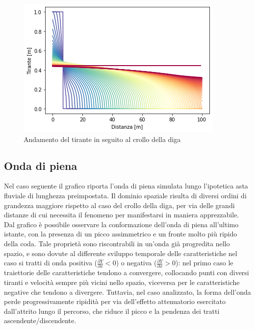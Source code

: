 \documentclass[12pt]{article} %
\begin{document}
\begin{figure} [H]
    \centering
    \includegraphics[scale=0.95]{Diga.png}
    \caption{Andamento del tirante in seguito al crollo della diga}
    \label{fig:diga}
\end{figure}

\subsection{Onda di piena}

\noindent Nel caso seguente il grafico riporta l'onda di piena simulata lungo l'ipotetica asta fluviale di lunghezza preimpostata. Il dominio spaziale risulta di diversi ordini di grandezza maggiore rispetto al caso del crollo della diga, per via delle grandi distanze di cui necessita il fenomeno per manifestarsi in maniera apprezzabile.\\
Dal grafico è possibile osservare la conformazione dell'onda di piena all'ultimo istante, con la presenza di un picco assimmetrico e un fronte molto più ripido della coda. Tale proprietà sono riscontrabili in un'onda già progredita nello spazio, e sono dovute al differente sviluppo temporale delle caratteristiche nel caso si tratti di onda positiva ($\frac{\partial Y}{\partial x}<0$) o negativa ($\frac{\partial Y}{\partial x}>0$): nel primo caso le traiettorie delle caratteristiche tendono a convergere, collocando punti con diversi tiranti e velocità sempre più vicini nello spazio, viceversa per le caratteristiche negative che tendono a divergere. Tuttavia, nel caso analizzato, la forma dell'onda perde progressivamente ripidità per via dell'effetto attenuatorio esercitato dall'attrito lungo il percorso, che riduce il picco e la pendenza dei tratti ascendente/discendente.
\end{document}
